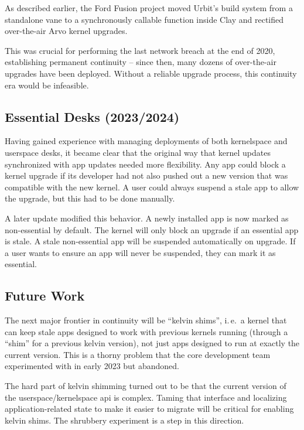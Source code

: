 \documentclass[twoside]{article}
\begin{document}
As described earlier, the Ford Fusion project moved Urbit's build system from a standalone vane to a synchronously callable function inside Clay and rectified over-the-air Arvo kernel upgrades.

\sloppy
This was crucial for performing the last network breach at the end of 2020, establishing permanent continuity – since then, many dozens of over-the-air upgrades have been deployed.  Without a reliable upgrade process, this continuity era would be infeasible.

\subsection{Essential Desks (2023/2024)}

Having gained experience with managing deployments of both kernelspace and userspace desks, it became clear that the original way that kernel updates synchronized with app updates needed more flexibility.  Any app could block a kernel upgrade if its developer had not also pushed out a new version that was compatible with the new kernel.  A user could always suspend a stale app to allow the upgrade, but this had to be done manually.

A later update modified this behavior.  A newly installed app is now marked as non-essential by default.  The kernel will only block an upgrade if an essential app is stale. A stale non-essential app will be suspended automatically on upgrade.  If a user wants to ensure an app will never be suspended, they can mark it as essential.

\subsection{Future Work}

The next major frontier in continuity will be ``kelvin shims'', i.\,e.\ a kernel that can keep stale apps designed to work with previous kernels running (through a ``shim'' for a previous kelvin version), not just apps designed to run at exactly the current version.  This is a thorny problem that the core development team experimented with in early 2023 but abandoned.

The hard part of kelvin shimming turned out to be that the current version of the userspace/kernelspace {\sc api} is complex.  Taming that interface and localizing application-related state to make it easier to migrate will be critical for enabling kelvin shims.  The shrubbery experiment is a step in this direction.
\end{document}
